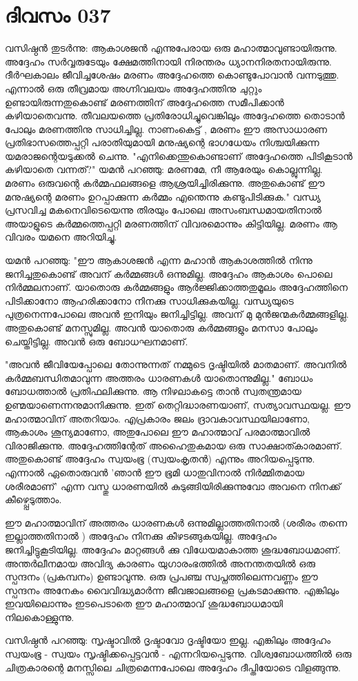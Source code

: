 \newpage
\section{ദിവസം 037}


വസിഷ്ഠന്‍ തുടര്‍ന്നു: ആകാശജന്‍ എന്നുപേരായ ഒരു മഹാത്മാവുണ്ടായിരുന്നു. അദ്ദേഹം സര്‍വ്വരുടേയും ക്ഷേമത്തിനായി നിരന്തരം ധ്യാനനിരതനായിരുന്നു. ദീര്‍ഘകാലം ജീവിച്ചശേഷം മരണം അദ്ദേഹത്തെ കൊണ്ടുപോവാന്‍ വന്നടുത്തു. എന്നാല്‍ ഒരു തീവ്രമായ അഗ്നിവലയം അദ്ദേഹത്തിനു ചുറ്റും ഉണ്ടായിരുന്നതുകൊണ്ട്‌ മരണത്തിന്‌ അദ്ദേഹത്തെ സമീപിക്കാന്‍ കഴിയാതെവന്നു. തീവലയത്തെ പ്രതിരോധിച്ചുവെങ്കിലും അദ്ദേഹത്തെ തൊടാന്‍ പോലും മരണത്തിനു സാധിച്ചില്ല. നാണംകെട്ട്‌ , മരണം ഈ അസാധാരണ പ്രതിഭാസത്തെപ്പറ്റി പരാതിയുമായി മനുഷ്യന്റെ ഭാഗധേയം നിശ്ചയിക്കുന്ന യമരാജന്റെയടുക്കല്‍ ചെന്നു. "എനിക്കെന്തുകൊണ്ടാണ്‌ അദ്ദേഹത്തെ പിടികൂടാന്‍ കഴിയാതെ വന്നത്‌?" യമന്‍ പറഞ്ഞു: മരണമേ, നീ ആരേയും കൊല്ലുന്നില്ല. മരണം ഒരുവന്റെ കര്‍മ്മഫലങ്ങളെ ആശ്രയിച്ചിരിക്കുന്നു. അതുകൊണ്ട്‌ ഈ മനുഷ്യന്റെ മരണം ഉറപ്പാക്കുന്ന കര്‍മ്മം എന്തെന്നു കണ്ടുപിടിക്കുക." വന്ധ്യ പ്രസവിച്ച മകനെവിടെയെന്നു തിരയും പോലെ അസംബന്ധമായതിനാല്‍ അയാളുടെ കര്‍മ്മത്തെപ്പറ്റി മരണത്തിന്‌ വിവരമൊന്നും കിട്ടിയില്ല. മരണം ആ വിവരം യമനെ അറിയിച്ചു.

യമന്‍ പറഞ്ഞു: "ഈ ആകാശജന്‍ എന്ന മഹാന്‍ ആകാശത്തില്‍ നിന്നു ജനിച്ചതുകൊണ്ട്‌ അവന്‌ കര്‍മ്മങ്ങള്‍ ഒന്നുമില്ല. അദ്ദേഹം ആകാശം പൊലെ നിര്‍മ്മലനാണ്‌. യാതൊരു കര്‍മ്മങ്ങളും ആര്‍ജ്ജിക്കാത്തതുമൂലം അദ്ദേഹത്തിനെ പിടിക്കാനോ ആഹരിക്കാനോ നിനക്കു സാധിക്കുകയില്ല. വന്ധ്യയുടെ പുത്രനെന്നപോലെ അവന്‍ ഇനിയും ജനിച്ചിട്ടില്ല. അവന്‌ മു  മുന്‍ജന്മകര്‍മ്മങ്ങളില്ല. അതുകൊണ്ട്‌ മനസ്സുമില്ല. അവന്‍ യാതൊരു കര്‍മ്മങ്ങളും മനസാ പോലും ചെയ്തിട്ടില്ല. അവന്‍ ഒരു ബോധഘനമാണ്‌. 

"അവന്‍ ജീവിയേപ്പോലെ തോന്നുന്നത്‌ നമ്മുടെ ദൃഷ്ടിയില്‍ മാതമാണ്‌. അവനില്‍ കര്‍മ്മബന്ധിതമാവുന്ന അത്തരം ധാരണകള്‍ യാതൊന്നുമില്ല." ബോധം ബോധത്താല്‍ പ്രതിഫലിക്കുന്നു. ആ നിഴലാകട്ടെ താന്‍ സ്വതന്ത്രമായ ഉണ്മയാണെന്നനുമാനിക്കുന്നു. ഇത്‌ തെറ്റിദ്ധാരണയാണ്‌, സത്യാവസ്ഥയല്ല. ഈ മഹാത്മാവിന്‌ അതറിയാം. എപ്രകാരം ജലം ദ്രാവകാവസ്ഥയിലാണോ, ആകാശം ശൂന്യമാണോ, അതുപോലെ ഈ മഹാത്മാവ്‌ പരമാത്മാവില്‍ വിരാജിക്കുന്നു. അദ്ദേഹത്തിന്റേത്‌ അഹൈതുകമായ ഒരു സാക്ഷാത്കാരമാണ്‌. അതുകൊണ്ട്‌ അദ്ദേഹം സ്വയംഭൂ (സ്വയംകൃതന്‍) എന്നും അറിയപ്പെടുന്നു. എന്നാല്‍ ഏതൊരുവന്‍ 'ഞാന്‍ ഈ ഭൂമി ധാതുവിനാല്‍ നിര്‍മ്മിതമായ ശരീരമാണ്‌' എന്ന വസ്തു ധാരണയില്‍ കുടുങ്ങിയിരിക്കുന്നുവോ അവനെ നിനക്ക്‌ കീഴ്പ്പെടുത്താം. 

ഈ മഹാത്മാവിന്‌ അത്തരം ധാരണകള്‍ ഒന്നുമില്ലാത്തതിനാല്‍ (ശരീരം തന്നെ ഇല്ലാത്തതിനാല്‍ ) അദ്ദേഹം നിനക്കു കീഴടങ്ങുകയില്ല. അദ്ദേഹം ജനിച്ചിട്ടുകൂടിയില്ല. അദ്ദേഹം മാറ്റങ്ങള്‍ ക്കു വിധേയമാകാത്ത ശുദ്ധബോധമാണ്‌. അന്തര്‍ലീനമായ അവിദ്യ കാരണം യുഗാരംഭത്തില്‍ അനന്തതയില്‍ ഒരു  സ്പന്ദനം  (പ്രകമ്പനം) ഉണ്ടാവുന്നു. ഒരു പ്രപഞ്ച സ്വപ്നത്തിലെന്നവണ്ണം ഈ സ്പന്ദനം  അനേകം വൈവിദ്ധ്യമാര്‍ന്ന ജീവജാലങ്ങളെ പ്രകടമാക്കുന്നു. എങ്കിലും ഇവയിലൊന്നും ഇടപെടാതെ ഈ മഹാത്മാവ്‌ ശുദ്ധബോധമായി നിലകൊള്ളുന്നു.

വസിഷ്ഠന്‍ പറഞ്ഞു: സൃഷ്ടാവില്‍ ദൃഷ്ടാവോ ദൃഷ്ടിയോ ഇല്ല. എങ്കിലും അദ്ദേഹം സ്വയംഭൂ - സ്വയം സൃഷ്ടിക്കപ്പെട്ടവന്‍ - എന്നറിയപ്പെടുന്നു. വിശ്വബോധത്തില്‍ ഒരു ചിത്രകാരന്റെ മനസ്സിലെ ചിത്രമെന്നപോലെ അദ്ദേഹം ദീപ്തിയോടെ വിളങ്ങുന്നു.

